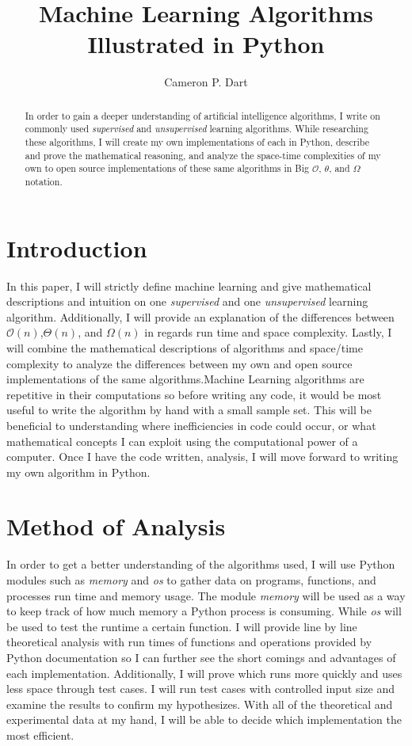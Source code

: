 \documentclass[a4paper]{article}
\title{Machine Learning Algorithms Illustrated in Python}
\author{Cameron P. Dart}
\begin{document}
\maketitle
\begin{abstract}
In order to gain a deeper understanding of artificial intelligence algorithms, I write on commonly used \textit{supervised} and \textit{unsupervised} learning algorithms. While researching these algorithms, I will create my own implementations of each in Python, describe and prove the mathematical reasoning, and analyze the space-time complexities of my own to open source implementations of these same algorithms in Big $\mathcal{O}$, $\theta$, and $\Omega$ notation.
\end{abstract}

\section{Introduction}
In this paper, I will strictly define machine learning and give mathematical descriptions and intuition on one \textit{supervised} and one \textit{unsupervised} learning algorithm. Additionally, I will provide an explanation of the differences between $\mathcal{O}(n)$,$\Theta(n)$, and $\Omega(n)$ in regards run time and space complexity. Lastly, I will combine the mathematical descriptions of algorithms and space/time complexity to analyze the differences between my own and open source implementations of the same algorithms.Machine Learning algorithms are repetitive in their computations so before writing any code, it would be most useful to write the algorithm by hand with a small sample set. This will be beneficial to understanding where inefficiencies in code could occur, or what mathematical concepts I can exploit using the computational power of a computer. Once I have the code written, analysis, I will move forward to writing my own algorithm in Python.   

\section{Method of Analysis}
In order to get a better understanding of the algorithms used, I will use Python modules such as \textit{memory} and \textit{os} \cite{WikiPython} to gather data on  programs, functions, and processes run time and memory usage. The module \textit{memory} will be used as a way to keep track of how much memory a Python process is consuming. While \textit{os} will be used to test the runtime a certain function. 
I will provide line by line theoretical analysis with run times of functions and operations provided by Python documentation so I can further see the short comings and advantages of each implementation. Additionally, I will prove which runs more quickly and uses less space through test cases. I will run test cases with controlled input size and examine the results to confirm my hypothesizes. With all of the theoretical and experimental data at my hand, I will be able to decide which implementation the most efficient.  
\end{document}
